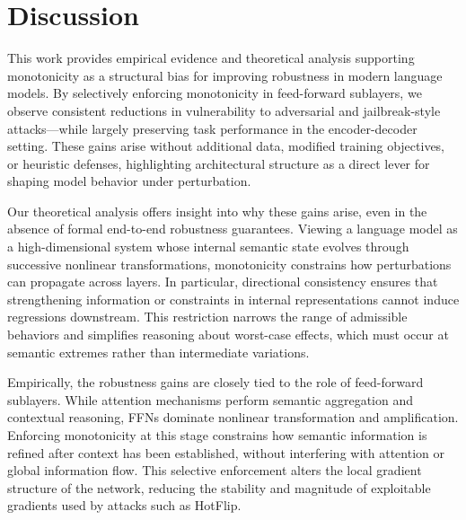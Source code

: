 \documentclass{article}
\theoremstyle{plain}
\theoremstyle{definition}
\theoremstyle{remark}
\begin{document}
\section{Discussion}
\label{sec:discussion}

This work provides empirical evidence and theoretical analysis supporting monotonicity as a structural bias for improving robustness in modern language models. By selectively enforcing monotonicity in feed-forward sublayers, we observe consistent reductions in vulnerability to adversarial and jailbreak-style attacks—while largely preserving task performance in the encoder-decoder setting. These gains arise without additional data, modified training objectives, or heuristic defenses, highlighting architectural structure as a direct lever for shaping model behavior under perturbation.


Our theoretical analysis offers insight into why these gains arise, even in the absence of formal end-to-end robustness guarantees. Viewing a language model as a high-dimensional system whose internal semantic state evolves through successive nonlinear transformations, monotonicity constrains how perturbations can propagate across layers. In particular, directional consistency ensures that strengthening information or constraints in internal representations cannot induce regressions downstream. This restriction narrows the range of admissible behaviors and simplifies reasoning about worst-case effects, which must occur at semantic extremes rather than intermediate variations.

Empirically, the robustness gains are closely tied to the role of feed-forward sublayers. While attention mechanisms perform semantic aggregation and contextual reasoning, FFNs dominate nonlinear transformation and amplification. Enforcing monotonicity at this stage constrains how semantic information is refined after context has been established, without interfering with attention or global information flow. This selective enforcement alters the local gradient structure of the network, reducing the stability and magnitude of exploitable gradients used by attacks such as HotFlip.

\end{document}
